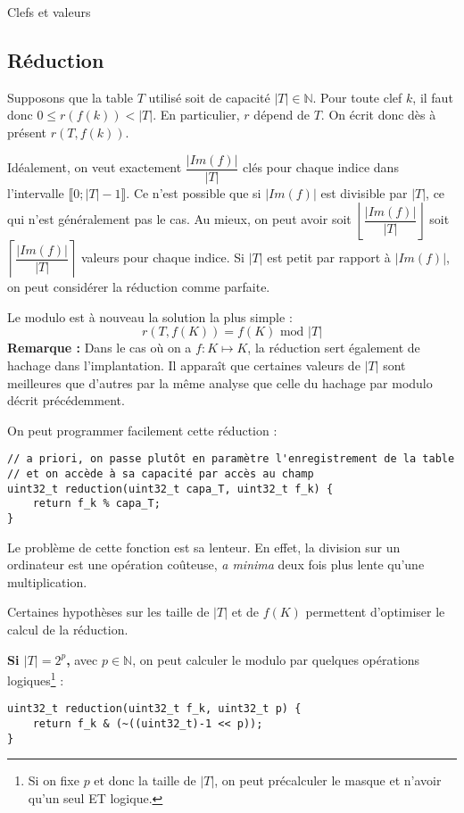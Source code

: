 \documentclass[../../../main.tex]{subfiles}
\begin{document}
\begin{definition}{Clefs et valeurs}
\subsection{Réduction}
Supposons que la table $T$ utilisé soit de capacité $|T|\in\mathbb{N}$. Pour toute clef $k$, il faut donc $0\leq r(f(k)) < |T|$. En particulier, $r$ dépend de $T$. On écrit donc dès à présent $r(T, f(k))$.

Idéalement, on veut exactement $\dfrac{|Im(f)|}{|T|}$ clés pour chaque indice dans l'intervalle $\llbracket 0; |T| - 1\rrbracket$. Ce n'est possible que si $|Im(f)|$ est divisible par $|T|$, ce qui n'est généralement pas le cas. Au mieux, on peut avoir soit $\left\lfloor \dfrac{|Im(f)|}{|T|}\right\rfloor$ soit $\left\lceil \dfrac{|Im(f)|}{|T|}\right\rceil$ valeurs pour chaque indice. Si $|T|$ est petit par rapport à $|Im(f)|$, on peut considérer la réduction comme parfaite.

Le modulo est à nouveau la solution la plus simple :
$$r(T, f(K)) = f(K)\text{ mod }|T|$$
\textbf{Remarque :} Dans le cas où on a $f : K\mapsto K$, la réduction sert également de hachage dans l'implantation. Il apparaît que certaines valeurs de $|T|$ sont meilleures que d'autres par la même analyse que celle du hachage par modulo décrit précédemment. %

On peut programmer facilement cette réduction :
\begin{verbatim}
// a priori, on passe plutôt en paramètre l'enregistrement de la table
// et on accède à sa capacité par accès au champ
uint32_t reduction(uint32_t capa_T, uint32_t f_k) {
	return f_k % capa_T;
}
\end{verbatim}
Le problème de cette fonction est sa lenteur. En effet, la division sur un ordinateur est une opération coûteuse, \textit{a minima} deux fois plus lente qu'une multiplication.

Certaines hypothèses sur les taille de $|T|$ et de $f(K)$ permettent d'optimiser le calcul de la réduction. 

\textbf{Si $|T| = 2^p$,} avec $p\in\mathbb{N}$, on peut calculer le modulo par quelques opérations logiques\footnote{Si on fixe $p$ et donc la taille de $|T|$, on peut précalculer le masque et n'avoir qu'un seul ET logique.} :
\begin{verbatim}
uint32_t reduction(uint32_t f_k, uint32_t p) {
	return f_k & (~((uint32_t)-1 << p));
}
\end{verbatim}


\end{definition}
\end{document}
